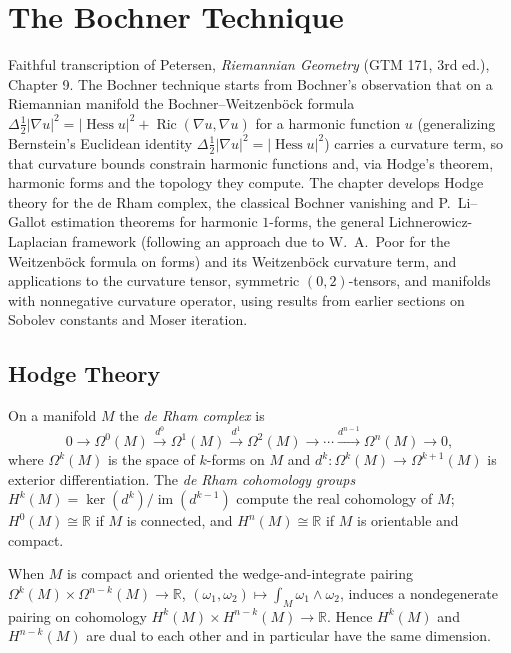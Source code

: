 \chapter{The Bochner Technique}
\label{chap:pet-the-bochner-technique}

Faithful transcription of Petersen, \emph{Riemannian Geometry} (GTM 171, 3rd ed.),
Chapter 9. The Bochner technique starts from Bochner's observation that on a
Riemannian manifold the Bochner--Weitzenb\"ock formula
$\Delta\tfrac12|\nabla u|^2=|\operatorname{Hess}u|^2+\operatorname{Ric}(\nabla u,\nabla u)$
for a harmonic function $u$ (generalizing Bernstein's Euclidean identity
$\Delta\tfrac12|\nabla u|^2=|\operatorname{Hess}u|^2$) carries a curvature term, so that
curvature bounds constrain harmonic functions and, via Hodge's theorem, harmonic
forms and the topology they compute. The chapter develops Hodge theory for the
de Rham complex, the classical Bochner vanishing and P.\ Li--Gallot estimation
theorems for harmonic $1$-forms, the general Lichnerowicz-Laplacian framework
(following an approach due to W.\ A.\ Poor for the Weitzenb\"ock formula on forms)
and its Weitzenb\"ock curvature term, and applications to the curvature tensor,
symmetric $(0,2)$-tensors, and manifolds with nonnegative curvature operator,
using results from earlier sections on Sobolev constants and Moser iteration.

\section{Hodge Theory}

\begin{definition}
  \label{def:pet-ch9-de-rham-cohomology}
  On a manifold $M$ the \emph{de Rham complex} is
  \[
    0\to\Omega^0(M)\xrightarrow{d^0}\Omega^1(M)\xrightarrow{d^1}\Omega^2(M)\to\cdots
    \xrightarrow{d^{n-1}}\Omega^n(M)\to0,
  \]
  where $\Omega^k(M)$ is the space of $k$-forms on $M$ and $d^k:\Omega^k(M)\to
  \Omega^{k+1}(M)$ is exterior differentiation. The \emph{de Rham cohomology
  groups} $H^k(M)=\ker(d^k)/\operatorname{im}(d^{k-1})$ compute the real
  cohomology of $M$; $H^0(M)\cong\mathbb{R}$ if $M$ is connected, and $H^n(M)\cong\mathbb{R}$
  if $M$ is orientable and compact.
\end{definition}

\begin{remark}
  \label{rem:pet-ch9-poincare-duality}
  When $M$ is compact and oriented the wedge-and-integrate pairing
  $\Omega^k(M)\times\Omega^{n-k}(M)\to\mathbb{R}$, $(\omega_1,\omega_2)\mapsto
  \int_M\omega_1\wedge\omega_2$, induces a nondegenerate pairing on cohomology
  $H^k(M)\times H^{n-k}(M)\to\mathbb{R}$. Hence $H^k(M)$ and $H^{n-k}(M)$ are dual to
  each other and in particular have the same dimension.
\end{remark}

